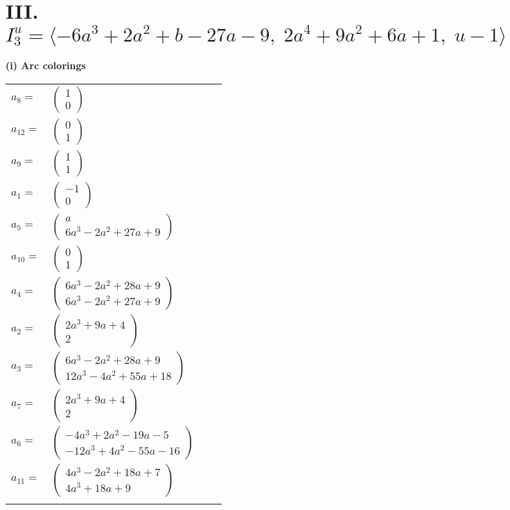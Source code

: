 \documentclass[1p]{elsarticle_modified}
\theoremstyle{definition}
\begin{document}
\centering \section*{III. $I^u_{3}= \langle -6 a^3+2 a^2+b-27 a-9,\;2 a^4+9 a^2+6 a+1,\;u-1 \rangle$}
\flushleft \textbf{(i) Arc colorings}\\
\begin{tabular}{m{7pt} m{180pt} m{7pt} m{180pt} }
\flushright $a_{8}=$&$\begin{pmatrix}1\\0\end{pmatrix}$ \\
\flushright $a_{12}=$&$\begin{pmatrix}0\\1\end{pmatrix}$ \\
\flushright $a_{9}=$&$\begin{pmatrix}1\\1\end{pmatrix}$ \\
\flushright $a_{1}=$&$\begin{pmatrix}-1\\0\end{pmatrix}$ \\
\flushright $a_{5}=$&$\begin{pmatrix}a\\6 a^3-2 a^2+27 a+9\end{pmatrix}$ \\
\flushright $a_{10}=$&$\begin{pmatrix}0\\1\end{pmatrix}$ \\
\flushright $a_{4}=$&$\begin{pmatrix}6 a^3-2 a^2+28 a+9\\6 a^3-2 a^2+27 a+9\end{pmatrix}$ \\
\flushright $a_{2}=$&$\begin{pmatrix}2 a^3+9 a+4\\2\end{pmatrix}$ \\
\flushright $a_{3}=$&$\begin{pmatrix}6 a^3-2 a^2+28 a+9\\12 a^3-4 a^2+55 a+18\end{pmatrix}$ \\
\flushright $a_{7}=$&$\begin{pmatrix}2 a^3+9 a+4\\2\end{pmatrix}$ \\
\flushright $a_{6}=$&$\begin{pmatrix}-4 a^3+2 a^2-19 a-5\\-12 a^3+4 a^2-55 a-16\end{pmatrix}$ \\
\flushright $a_{11}=$&$\begin{pmatrix}4 a^3-2 a^2+18 a+7\\4 a^3+18 a+9\end{pmatrix}$\\&\end{tabular}
\end{document}
